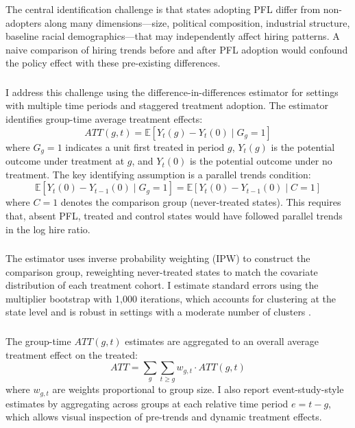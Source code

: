 \documentclass[12pt]{article}
\newcommand{\E}{\mathbb{E}}
\begin{document}
The central identification challenge is that states adopting PFL differ from non-adopters along many dimensions---size, political composition, industrial structure, baseline racial demographics---that may independently affect hiring patterns. A naive comparison of hiring trends before and after PFL adoption would confound the policy effect with these pre-existing differences.

\subsubsection*{}
I address this challenge using the \citet{callaway2021} difference-in-differences estimator for settings with multiple time periods and staggered treatment adoption. The estimator identifies group-time average treatment effects:
\begin{equation}
    ATT(g,t) = \E[Y_{t}(g) - Y_{t}(0) \mid G_g = 1]
\end{equation}
where $G_g = 1$ indicates a unit first treated in period $g$, $Y_t(g)$ is the potential outcome under treatment at $g$, and $Y_t(0)$ is the potential outcome under no treatment. The key identifying assumption is a parallel trends condition:
\begin{equation}
    \E[Y_t(0) - Y_{t-1}(0) \mid G_g = 1] = \E[Y_t(0) - Y_{t-1}(0) \mid C = 1]
\end{equation}
where $C = 1$ denotes the comparison group (never-treated states). This requires that, absent PFL, treated and control states would have followed parallel trends in the log hire ratio.

\subsubsection*{}
The estimator uses inverse probability weighting (IPW) to construct the comparison group, reweighting never-treated states to match the covariate distribution of each treatment cohort. I estimate standard errors using the multiplier bootstrap with 1,000 iterations, which accounts for clustering at the state level and is robust in settings with a moderate number of clusters \citep{callaway2021}.

\subsubsection*{}
The group-time $ATT(g,t)$ estimates are aggregated to an overall average treatment effect on the treated:
\begin{equation}
    ATT = \sum_{g} \sum_{t \geq g} w_{g,t} \cdot ATT(g,t)
\end{equation}
where $w_{g,t}$ are weights proportional to group size. I also report event-study-style estimates by aggregating across groups at each relative time period $e = t - g$, which allows visual inspection of pre-trends and dynamic treatment effects.
\end{document}
